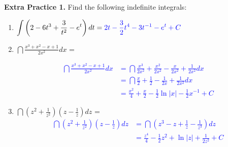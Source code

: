 \documentclass[10pt]{article}
\begin{document}
{\bf\color{blue}Extra Practice 1.} Find the following indefinite integrals:
\begin{enumerate}
\item[(a)] $\displaystyle\int \left(2 - 6t^3 + \frac{3}{t^2} - e^t \right) dt = \textcolor{blue}{2t - \frac{3}{2} t^4 - 3 t^{-1} - e^t + C}$
\item[(b)] $\dint \frac{x^3+x^2-x+1}{2x^2} dx$ = 

\textcolor{blue}{
\begin{align*}
\dint \frac{x^3+x^2-x+1}{2x^2} dx &= \dint \frac{x^3}{2x^2} + \frac{x^2}{2x^2} - \frac{x}{2x^2} + \frac{1}{2x^2} dx\\
&= \dint \frac{x}{2} + \frac{1}{2} - \frac{1}{2x} + \frac{1}{2x^2} dx\\
&= \frac{x^2}{4} + \frac{x}{2} - \frac{1}{2} \ln|x| - \frac{1}{2}x^{-1} + C
\end{align*}
}
\item[(c)] $\dint \left(z^2 + \frac1{z^2}\right) \left( z - \frac1{z} \right) dz$ = 
   \textcolor{blue}{
\begin{align*} 
\dint \left(z^2 + \frac1{z^2}\right) \left( z - \frac1{z} \right) dz &= \dint \left(z^3   - z + \frac{1}{z} - \frac{1}{z^3}\right) dz\\
&= \frac{z^4}{4} - \frac{1}{2}z^{2} + \ln|z| + \frac{1}{2z^2} + C
\end{align*}
   } \
\end{enumerate}

\end{document}
